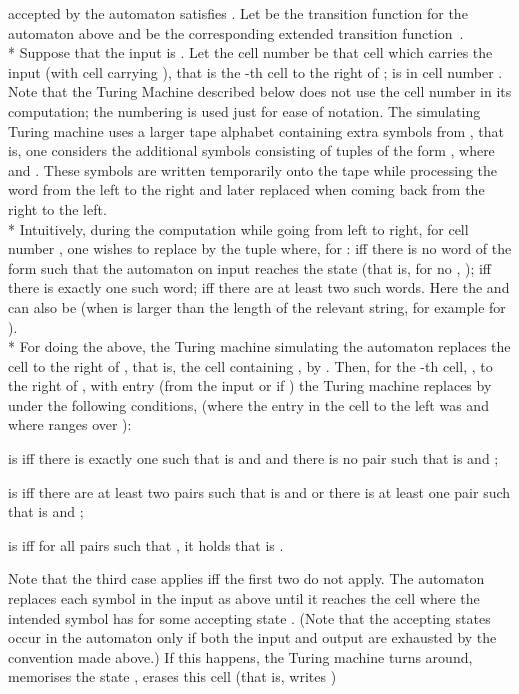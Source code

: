 \documentclass{LMCS}
\theoremstyle{plain}\newtheorem{athm}[thm]{Theorem}
\theoremstyle{plain}\newtheorem{aprop}[thm]{Proposition}
\theoremstyle{plain}\newtheorem{aprob}[thm]{Open Problem}
\theoremstyle{plain}\newtheorem{acor}[thm]{Corollary}
\theoremstyle{plain}\newtheorem{alem}[thm]{Lemma}
\theoremstyle{definition}\newtheorem{adefn}[thm]{Definition}
\theoremstyle{definition}\newtheorem{arem}[thm]{Remark}
\theoremstyle{plain}\newtheorem{aexmp}[thm]{Example}
\theoremstyle{plain}\newtheorem{aclm}[thm]{Claim}
\def\sp{\\*\indent}
\begin{document}
accepted by the automaton satisfies . 
Let  be the transition function for the automaton above
and  be the corresponding extended transition
function~\cite{HMU01}.
\sp
Suppose that the input is .
Let the cell number  be that cell which carries the input  
(with cell  carrying ), that is the -th cell to the
right of ;  is in cell number . 
Note that the Turing Machine described below
does not use the cell number in its computation; 
the numbering is used just for ease of notation.
The simulating Turing machine
uses a larger tape alphabet containing extra symbols from
,
that is, one considers the additional symbols consisting of tuples
of the form , where  
and
. These symbols are written temporarily onto
the tape while processing the word from the left to the right and later
replaced when coming back from the right to the left.
\sp
Intuitively, during the computation while going from left to right, 
for cell number ,
one wishes to replace  by the tuple  where,
for :  iff there is no word
of the form  such that the automaton on input
 reaches the state 
(that is, for no , 
); 
 iff there is exactly one
such word;  iff there are at least two such words. Here
the  and  can also be  (when  is larger than
the length of the relevant string, for example  for ).
\sp
For doing the above, the Turing machine simulating the automaton replaces the 
cell to the right of , that is,
the cell containing , by .
Then, for the -th cell, , 
to the right of ,
with entry  (from the input or
 if ) the Turing machine replaces  by
 under the following conditions,
(where the entry in the cell to the left was  and where  ranges over ): 
\begin{iteMize}{}
\item  is  iff there is exactly one  
  such that  is  and  
  and there is no pair  
   such that  
  is  and ;
\item  is  iff there are at least two pairs  
   such that
   is  and 
  or there is at least one pair  
  such that 
  is  and ;
\item  is  iff for all pairs  
  such that 
   , it holds that 
   is .
\end{iteMize}
Note that the third case applies iff the first two do not apply. The automaton
replaces each symbol in the input as above until it reaches the cell 
where the intended symbol  has
 for some accepting state .
(Note that the accepting states occur in the automaton only if both
the input and output are exhausted by the convention made above.)
If this happens, the Turing machine turns around, memorises
the state , erases this cell (that is, writes )
\end{document}
